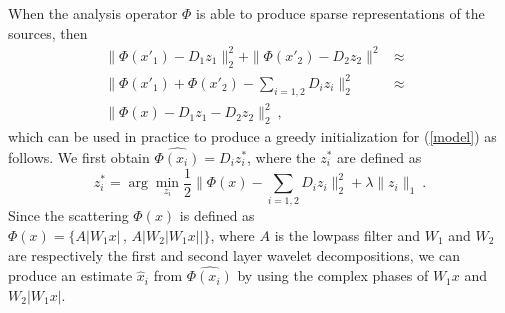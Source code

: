 When the analysis operator $\Phi$ is able to produce sparse representations of the sources, 
then 
\begin{eqnarray*}
\| \Phi(x'_1) - D_1 z_1 \|_2^2 + \| \Phi(x'_2) - D_2 z_2 \|^2 &\approx& \\
\| \Phi(x'_1) + \Phi(x'_2) - \sum_{i=1,2} D_i z_i \|_2^2 &\approx& \\
 \| \Phi(x) - D_1 z_1 - D_2 z_2 \|_2^2 ~,
\end{eqnarray*}
which can be used in practice to produce a greedy initialization for (\ref{model}) as follows. 
We first obtain $\widehat{\Phi(x_i)}= D_i z^*_i$, where the $z^*_i$ are defined as 
$$z^*_i = \arg\min_{z_i} \frac{1}{2}\| \Phi(x) - \sum_{i=1,2} D_i z_i \|_2^2 +\lambda \| z_i \|_1~.$$
Since the scattering $\Phi(x)$ is defined as \\$\Phi(x)= \{ A |W_1 x | \,,\, A | W_2 | W_1 x | | \}$, 
where $A$ is the lowpass filter and $W_1$ and $W_2$ are respectively the first and 
second layer wavelet decompositions, we can produce an estimate $\widehat{x}_i$ from 
$\widehat{\Phi(x_i)}$ by using the complex phases of $W_1 x$ and $W_2 |W_1 x|$.



%
%
%
%
%
%
